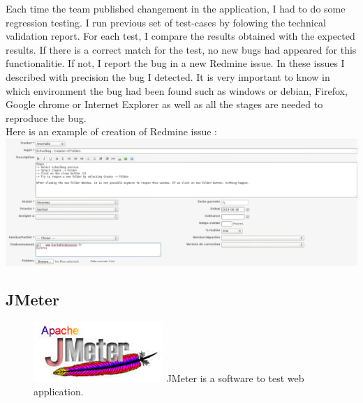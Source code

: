 Each time the team published changement in the application, I had to do some
regression testing. I run previous set of test-cases by folowing the 
technical validation report. For each test, I compare the results obtained
with the expected results. If there is a correct match for the test,
no new bugs had appeared for this functionalitie. If not, I report the bug in a new Redmine issue.
In these issues I described with precision the bug I detected. It is very 
important to know in which environment the bug had been found such as 
windows or debian, Firefox, Google chrome or Internet Explorer as well as 
all the stages are needed to reproduce the bug.  \\ 

Here is an example of creation of Redmine issue : \\ 

\includegraphics[scale=0.25]{Images/issue.png} 



\newpage
\subsection{JMeter}
\begin{figure}[h]
	\includegraphics[scale=0.5]{Images/JMeter.jpeg}
	JMeter is a software to test web application.
\end{figure}


